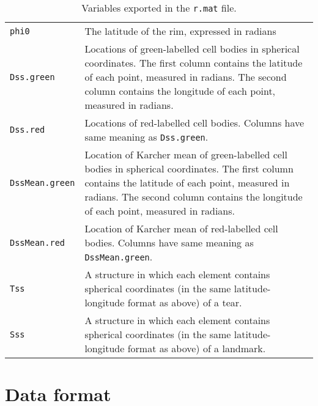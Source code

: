 \documentclass{article}
\begin{document}
\begin{table}
  \begin{tabularx}{\linewidth}{lX}
    \hline \texttt{phi0} & The latitude of the rim, expressed in
    radians
    \\
    \texttt{Dss.green} & Locations of green-labelled cell bodies in
    spherical coordinates. The first column contains the latitude of
    each point, measured in radians. The second column contains the
    longitude of each point, measured in radians. \\
    \texttt{Dss.red} & Locations of red-labelled cell
    bodies. Columns have same meaning as \texttt{Dss.green}. \\
    \texttt{DssMean.green} & Location of Karcher mean of
    green-labelled cell bodies in spherical coordinates. The first
    column contains the latitude of each point, measured in
    radians. The second column contains the
    longitude of each point, measured in radians. \\
    \texttt{DssMean.red} & Location of Karcher mean of red-labelled
    cell bodies. Columns have same meaning as \texttt{DssMean.green}. \\
    \texttt{Tss} & A structure in which each element contains
    spherical coordinates (in the same latitude-longitude format as
    above) of a tear. \\
    \texttt{Sss} & A structure in which each element contains
    spherical coordinates (in the same latitude-longitude format as
    above) of a landmark. \\
    \hline
  \end{tabularx}
  \caption{Variables exported in the \texttt{r.mat} file.}
  \label{tab:matlab-export}
\end{table}

\appendix

\section{Data format}
\label{manual:sec:reading-data}
\end{document}

